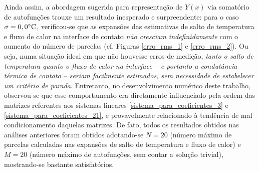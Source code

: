 Ainda assim, a abordagem sugerida para representação de $Y(x)$ via somatório de autofunções trouxe um resultado inesperado e surpreendente: para o caso $\sigma = 0,0\celsius$, verificou-se que as expansões das estimativas de salto de temperatura e fluxo de calor na interface de contato \textit{não cresciam indefinidamente} com o aumento do número de parcelas (cf. Figuras \ref{erro_rms_1} e \ref{erro_rms_2}). Ou seja, numa situação ideal em que não houvesse erros de medição, \textit{tanto o salto de temperatura quanto o fluxo de calor na interface -- e portanto a condutância térmica de contato -- seriam facilmente estimados, sem necessidade de estabelecer um critério de parada}. Entretanto, no desenvolvimento numérico deste trabalho, observou-se que esse comportamento era diretamente influenciado pela ordem das matrizes referentes aos sistemas lineares \eqref{sistema_para_coeficientes_3} e \eqref{sistema_para_coeficientes_21}, e provavelmente relacionado à tendência de mal condicionamento daquelas matrizes. De fato, todos os resultados obtidos nas análises anteriores foram obtidos adotando-se $N = 20$ (número máximo de parcelas calculadas nas expansões de salto de temperatura e fluxo de calor) e $M = 20$ (número máximo de autofunções, sem contar a solução trivial), mostrando-se bastante satisfatórios.





